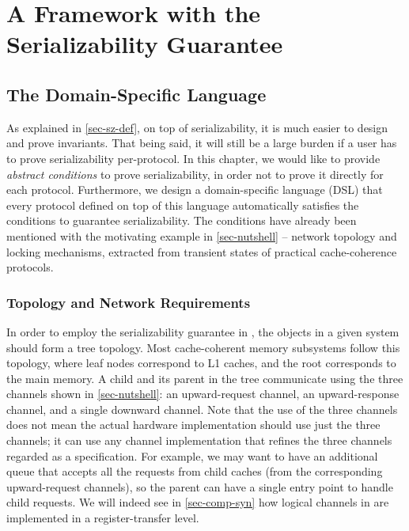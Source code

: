 \part{A Framework with the Serializability Guarantee}

\chapter{The \hemiola{} Domain-Specific Language}
\label{sec-hemiola-dsl}

As explained in \autoref{sec-sz-def}, on top of serializability, it is much easier to design and prove invariants.
That being said, it will still be a large burden if a user has to prove serializability per-protocol.
In this chapter, we would like to provide \emph{abstract conditions} to prove serializability, in order not to prove it directly for each protocol.
Furthermore, we design a domain-specific language (DSL) that every protocol defined on top of this language automatically satisfies the conditions to guarantee serializability.
The conditions have already been mentioned with the motivating example in \autoref{sec-nutshell} -- network topology and locking mechanisms, extracted from transient states of practical cache-coherence protocols.

\section{Topology and Network Requirements}
\label{sec-topo-net-reqs}

In order to employ the serializability guarantee in \hemiola{}, the objects in a given system should form a tree topology.
Most cache-coherent memory subsystems follow this topology, where leaf nodes correspond to L1 caches, and the root corresponds to the main memory.
A child and its parent in the tree communicate using the three channels shown in \autoref{sec-nutshell}: an upward-request channel, an upward-response channel, and a single downward channel.
Note that the use of the three channels does not mean the actual hardware implementation should use just the three channels; it can use any channel implementation that refines the three channels regarded as a specification.
For example, we may want to have an additional queue that accepts all the requests from child caches (from the corresponding upward-request channels), so the parent can have a single entry point to handle child requests.
We will indeed see in \autoref{sec-comp-syn} how logical channels in \hemiola{} are implemented in a register-transfer level.

